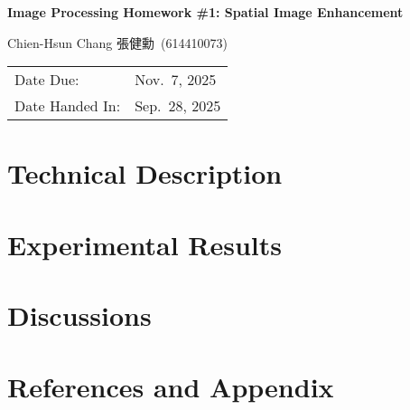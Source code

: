 \documentclass[12pt,a4paper]{article}
\newcommand{\HomeworkTitle}{Image Processing Homework \#1: Spatial Image Enhancement}
\newcommand{\StudentName}{Chien-Hsun Chang 張健勳}
\newcommand{\StudentID}{614410073}
\newcommand{\StudentInfo}{\StudentName~(\StudentID)}
\newcommand{\DateDue}{Nov.\ 7, 2025}
\newcommand{\DateHandedIn}{Sep.\ 28, 2025}
\begin{document}
\begin{titlepage} %
	\centering
	{\vspace*{2cm}\Huge\bfseries \HomeworkTitle\par}
	\vspace{2cm}
    {\Large \StudentInfo\par}
	\vfill
	\begin{tabular}{ll}
		Date Due: & {\DateDue} \\
		Date Handed In: & {\DateHandedIn} \\
	\end{tabular}
	\vfill
\end{titlepage}

\section{Technical Description} %

\section{Experimental Results} %

\section{Discussions} %

\section{References and Appendix} %
\end{document}
